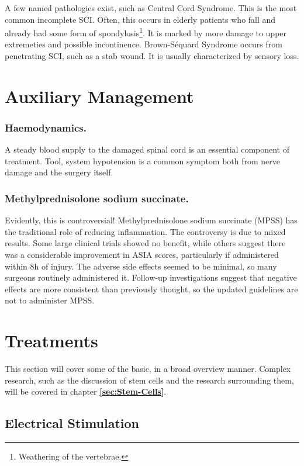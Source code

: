 \documentclass[12pt]{report}
\begin{document}
A few named pathologies exist, such as Central Cord Syndrome. This is the most common incomplete SCI. Often, this occurs in elderly patients who fall and already had some form of spondylosis\footnote{Weathering of the vertebrae.}. It is marked by more damage to upper extremeties and possible incontinence. Brown-Séquard Syndrome occurs from penetrating SCI, such as a stab wound. It is usually characterized by sensory loss. 

\section{Auxiliary Management}

\subsubsection{Haemodynamics.}
A steady blood supply to the damaged spinal cord is an essential component of treatment. Tool, system hypotension is a common symptom both from nerve damage and the surgery itself. 

\subsubsection{Methylprednisolone sodium succinate.}
Evidently, this is controversial! Methylprednisolone sodium succinate (MPSS) has the traditional role of reducing inflammation. The controversy is due to mixed results. Some large clinical trials showed no benefit, while others suggest there was a considerable improvement in ASIA scores, particularly if administered within 8h of injury. The adverse side effects seemed to be minimal, so many surgeons routinely administered it. Follow-up investigations suggest that negative effects are more consistent than previously thought, so the updated guidelines are not to administer MPSS. 

\section{Treatments}

This section will cover some of the basic, in a broad overview manner. Complex research, such as the discussion of stem cells and the research surrounding them, will be covered in chapter \textbf{\ref{sec:Stem-Cells}}. \newline

\subsection{Electrical Stimulation}
\end{document}
